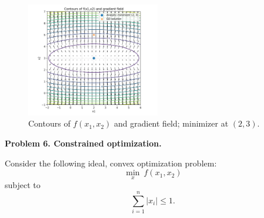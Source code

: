 \documentclass[11pt]{article}
\begin{document}
\begin{figure}[H]
	\centering
	\includegraphics[width=0.52\textwidth]{5.png}
	\caption{Contours of $f(x_1,x_2)$ and gradient field; minimizer at $(2,3)$.}
	\label{fig:p5}
\end{figure}

\newpage

\textbf{Problem 6. Constrained optimization.}

Consider the following ideal, convex optimization problem:
\[
\min_{x}\ f(x_1,x_2) \tag{19}
\]
subject to
\[
\sum_{i=1}^{n} |x_i| \le 1.
\]
\end{document}
